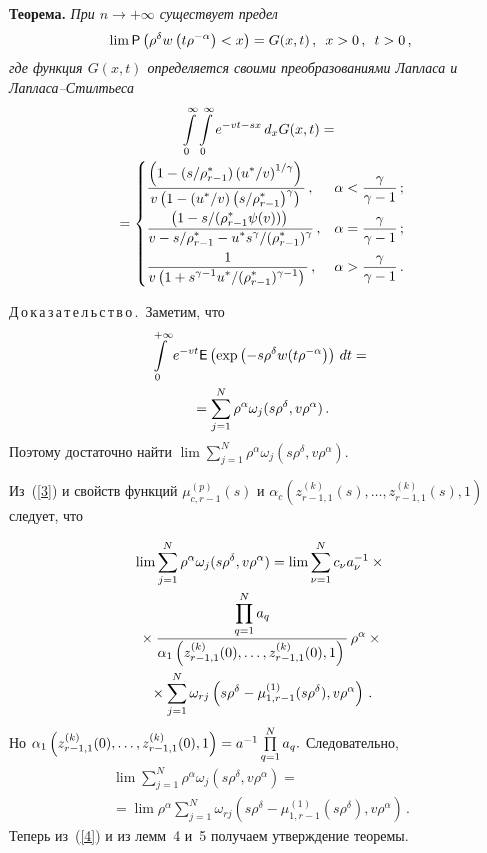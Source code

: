 \begin{multicols}{2}
\medskip

\noindent
\textbf{Теорема.} \textit{При $n\rightarrow +\infty$ существует предел}
$$
\lim{\sf P}\left(\rho^{\delta}w\left(t\rho^{-\alpha}\right)<x\right)=G(x,t)\,,\enskip x>0\,,\enskip t>0\,,
$$
\textit{где функция $G(x,t)$ определяется своими преобразованиями Лапласа и Лап\-ла\-са--Стилть\-еса}
\begin{multline*}
\int\limits_{0}^{\infty}\int\limits_{0}^{\infty}e^{-vt-sx}\,d_xG(x,t)={}\\
{}=
\begin{cases}
\displaystyle\frac{\displaystyle \left(1-({s}/{\rho^*_{r-1}})\left({u^*}/{v}\right)^{{1}/{\gamma}}\right)\mathstrut}{\displaystyle v\left(1-({u^*}/{v})\left({s}/{\rho^*_{r-1}}\right)^{\gamma}\right)\mathstrut}\,,&\alpha<\displaystyle\frac{\displaystyle \gamma\mathstrut}{\displaystyle \gamma-1\mathstrut}\,;\\[9pt]
\displaystyle\frac{\displaystyle \left(1-{s}/({\rho^*_{r-1}\psi(v)})\right)\mathstrut}{\displaystyle v-{s}/{\rho_{r-1}^*}-
{u^*s^{\gamma}}/{(\rho^{*}_{r-1})^{\gamma}}\mathstrut}\,,& \alpha=\displaystyle\frac{\displaystyle \gamma\mathstrut}{\displaystyle \gamma-1\mathstrut}\,;\\[9pt]
\displaystyle\frac{\displaystyle 1\mathstrut}{\displaystyle v\left(1+{s^{\gamma-1}u^*}/{(\rho_{r-1}^*)^{\gamma-1}}\right)\mathstrut}\,,& \alpha>\displaystyle\frac{\displaystyle \gamma\mathstrut}{\displaystyle \gamma-1\mathstrut}\,.
\end{cases}
\end{multline*}

\noindent
Д\,о\,к\,а\,з\,а\,т\,е\,л\,ь\,с\,т\,в\,о\,.\
Заметим, что
\begin{multline*}
\int\limits_{0}^{+\infty}e^{-vt}{\sf E}\left(\exp\left(-s\rho^{\delta}
w(t\rho^{-\alpha}\right)\right)\,dt={}\\
{}=
\sum\limits_{j=1}^N\rho^{\alpha}\omega_{j}(s\rho^{\delta},v\rho^{\alpha})\,.
\end{multline*}
Поэтому достаточно найти 
$\lim \sum\limits_{j=1}^N\rho^{\alpha}\omega_{j}(s\rho^{\delta},v\rho^{\alpha}).$

Из~(\ref{3}) и свойств функций $\mu_{c,r-1}^{(p)}(s)$ и 
$\alpha_c\left(z_{r-1,1}^{(k)}(s),\ldots,z_{r-1,1}^{(k)}(s),1\right)$ следует, что

\noindent
\begin{multline*}
\lim \sum\limits_{j=1}^N\rho^{\alpha}\omega_{j}(s\rho^{\delta},v\rho^{\alpha})=
\lim\sum\limits_{\nu=1}^Nc_{\nu}a_{\nu}^{-1}\times{}\\
{}\times\displaystyle\frac{\displaystyle \prod\limits_{q=1}^Na_q\mathstrut}{\displaystyle \alpha_1\left(z_{r-1,1}^{(k)}(0),\ldots,z_{r-1,1}^{(k)}(0),1\right)\mathstrut}\,
\rho^{\alpha}\times{}\\
{}\times 
\sum\limits_{j=1}^N\omega_{rj}\left(s\rho^{\delta}-\mu_{1,r-1}^{(1)}(s\rho^{\delta}),v\rho^{\alpha}\right)\,.
\end{multline*}
Но $\alpha_1\left(z_{r-1,1}^{(k)}(0),\ldots,z_{r-1,1}^{(k)}(0),1\right)\hm=a^{-1}
\prod\limits_{q=1}^Na_q.$ Следовательно,
\begin{multline*}
\lim \sum\limits_{j=1}^N\rho^{\alpha}\omega_{j}(s\rho^{\delta},v\rho^{\alpha})={}\\
{}=
\lim\rho^{\alpha}\sum\limits_{j=1}^N\omega_{rj}\left(s\rho^{\delta}-\mu_{1,r-1}^{(1)}(s\rho^{\delta}),v\rho^{\alpha}\right)\,.
\end{multline*}
Теперь из~(\ref{4}) и из лемм~4 и~5 получаем утверждение теоремы.


\end{multicols}
